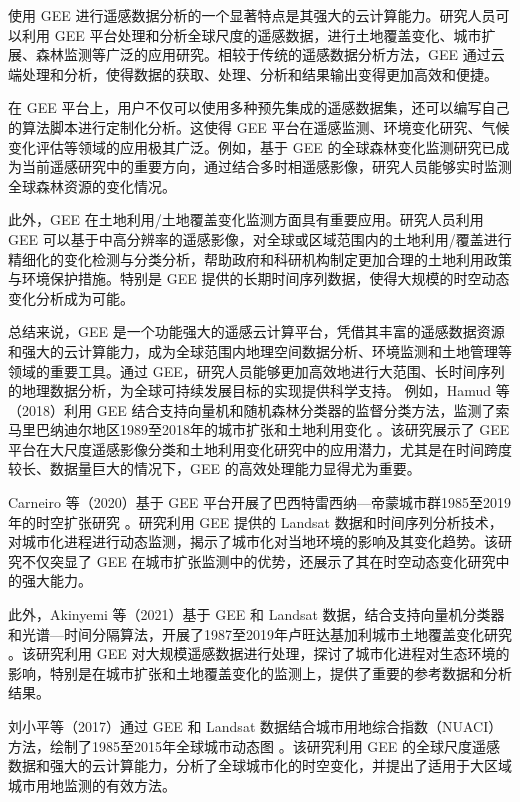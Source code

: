 \documentclass{article}
\begin{document}
	使用 GEE 进行遥感数据分析的一个显著特点是其强大的云计算能力。研究人员可以利用 GEE 平台处理和分析全球尺度的遥感数据，进行土地覆盖变化、城市扩展、森林监测等广泛的应用研究。相较于传统的遥感数据分析方法，GEE 通过云端处理和分析，使得数据的获取、处理、分析和结果输出变得更加高效和便捷。
	
	在 GEE 平台上，用户不仅可以使用多种预先集成的遥感数据集，还可以编写自己的算法脚本进行定制化分析。这使得 GEE 平台在遥感监测、环境变化研究、气候变化评估等领域的应用极其广泛。例如，基于 GEE 的全球森林变化监测研究已成为当前遥感研究中的重要方向，通过结合多时相遥感影像，研究人员能够实时监测全球森林资源的变化情况。
	
	此外，GEE 在土地利用/土地覆盖变化监测方面具有重要应用。研究人员利用 GEE 可以基于中高分辨率的遥感影像，对全球或区域范围内的土地利用/覆盖进行精细化的变化检测与分类分析，帮助政府和科研机构制定更加合理的土地利用政策与环境保护措施。特别是 GEE 提供的长期时间序列数据，使得大规模的时空动态变化分析成为可能。
	
	总结来说，GEE 是一个功能强大的遥感云计算平台，凭借其丰富的遥感数据资源和强大的云计算能力，成为全球范围内地理空间数据分析、环境监测和土地管理等领域的重要工具。通过 GEE，研究人员能够更加高效地进行大范围、长时间序列的地理数据分析，为全球可持续发展目标的实现提供科学支持。
	例如，Hamud 等（2018）利用 GEE 结合支持向量机和随机森林分类器的监督分类方法，监测了索马里巴纳迪尔地区1989至2018年的城市扩张和土地利用变化 \cite{Hamud2018}。该研究展示了 GEE 平台在大尺度遥感影像分类和土地利用变化研究中的应用潜力，尤其是在时间跨度较长、数据量巨大的情况下，GEE 的高效处理能力显得尤为重要。
	
	Carneiro 等（2020）基于 GEE 平台开展了巴西特雷西纳—帝蒙城市群1985至2019年的时空扩张研究 \cite{Carneiro2020}。研究利用 GEE 提供的 Landsat 数据和时间序列分析技术，对城市化进程进行动态监测，揭示了城市化对当地环境的影响及其变化趋势。该研究不仅突显了 GEE 在城市扩张监测中的优势，还展示了其在时空动态变化研究中的强大能力。
	
	此外，Akinyemi 等（2021）基于 GEE 和 Landsat 数据，结合支持向量机分类器和光谱—时间分隔算法，开展了1987至2019年卢旺达基加利城市土地覆盖变化研究 \cite{Akinyemi2021}。该研究利用 GEE 对大规模遥感数据进行处理，探讨了城市化进程对生态环境的影响，特别是在城市扩张和土地覆盖变化的监测上，提供了重要的参考数据和分析结果。
	
	刘小平等（2017）通过 GEE 和 Landsat 数据结合城市用地综合指数（NUACI）方法，绘制了1985至2015年全球城市动态图 \cite{Liu2017}。该研究利用 GEE 的全球尺度遥感数据和强大的云计算能力，分析了全球城市化的时空变化，并提出了适用于大区域城市用地监测的有效方法。
\end{document}

